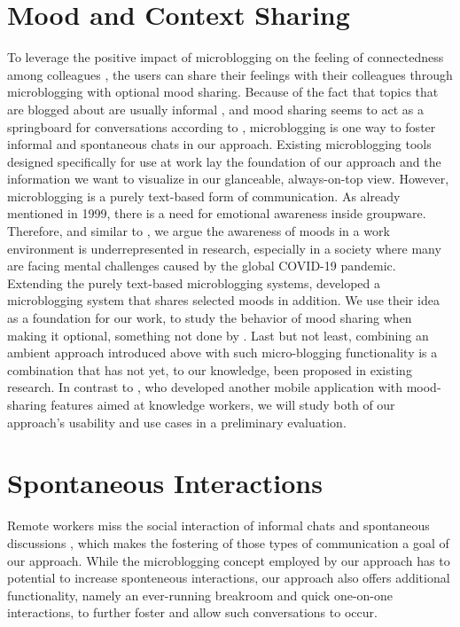 \section{Mood and Context Sharing}
To leverage the positive impact of microblogging on the feeling of connectedness among colleagues \autocite{dullemond2013fixing}, the users can share their feelings with their colleagues through microblogging with optional mood sharing. Because of the fact that topics that are blogged about are usually informal \autocite{ehrlich2010microblogging}, and mood sharing seems to act as a springboard for conversations according to \textcite{church2010study}, microblogging is one way to foster informal and spontaneous chats in our approach. Existing microblogging tools designed specifically for use at work lay the foundation of our approach and the information we want to visualize in our glanceable, always-on-top view. However, microblogging is a purely text-based form of communication. As \textcite{garcia1999emotional} already mentioned in 1999, there is a need for emotional awareness inside groupware. Therefore, and similar to \autocite{mora2011supporting}, we argue the awareness of moods in a work environment is underrepresented in research, especially in a society where many are facing mental challenges caused by the global COVID-19 pandemic. Extending the purely text-based microblogging systems, \textcite{dullemond2013fixing} developed a microblogging system that shares selected moods in addition. We use their idea as a foundation for our work, to study the behavior of mood sharing when making it optional, something not done by \textcite{dullemond2013fixing}. Last but not least, combining an ambient approach introduced above with such micro-blogging functionality is a combination that has not yet, to our knowledge, been proposed in existing research. In contrast to \textcite{saari2008mobile}, who developed another mobile application with mood-sharing features aimed at knowledge workers, we will study both of our approach's usability and use cases in a preliminary evaluation.

\section{Spontaneous Interactions}
Remote workers miss the social interaction of informal chats and spontaneous discussions \autocite{cooper2002telecommuting}, which makes the fostering of those types of communication a goal of our approach. While the microblogging concept employed by our approach has to potential to increase sponteneous interactions, our approach also offers additional functionality, namely an ever-running breakroom and quick one-on-one interactions, to further foster and allow such conversations to occur.


